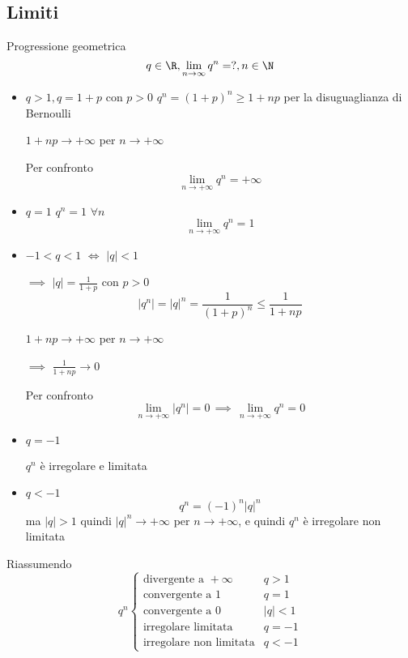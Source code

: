 \subsection{Limiti}
Progressione geometrica \[
        q \in \R, \lim_{n \to \infty} q^n=?, n \in \N 
    \]
    \begin{itemize}
        \item $q>1, q=1+p$ con $p>0$
            $ q^n = (1+p)^n \ge 1+np$ per la disuguaglianza di Bernoulli

            $ 1+np \to +\infty$ per $ n \to +\infty $

            Per confronto \[
                \lim_{n\to + \infty} q^n=+ \infty
            \]
        \item $ q=1 $ $ q^n = 1 $ $ \forall n $
        \[
            \lim_{n\to + \infty} q^n=1
        \]
        \item $ -1<q<1 $ $ \iff $ $ |q|<1 $ 
        
        $\implies$ $|q|=\frac{1}{1+p}$ con $ p>0 $ \[
            |q^n|=|q|^n=\frac{1}{(1+p)^n} \le \frac{1}{1+np}
        \]

        $ 1+np \to +\infty$ per $ n \to +\infty $ 
        
        $\implies$ $ \frac{1}{1+np} \to 0$

        Per confronto \[
            \lim_{n\to + \infty} |q^n| = 0 \,\implies\,\lim_{n\to + \infty} q^n = 0
        \]
        \item $ q=-1 $
        
        $ q^n $ è irregolare e limitata
        \item $ q<-1 $ \[
            q^n=(-1)^n|q|^n
        \]
        ma $ |q|>1 $ quindi $ |q|^n\to + \infty $ per $ n\to + \infty $, e quindi $ q^n $ è irregolare non limitata
    \end{itemize}
    Riassumendo \[
    q^n\begin{cases}
        \text{divergente a } + \infty &q>1\\
        \text{convergente a } 1 &q=1\\
        \text{convergente a } 0 &|q|<1\\
        \text{irregolare limitata} &q=-1\\
        \text{irregolare non limitata} &q<-1
    \end{cases}
    \]


